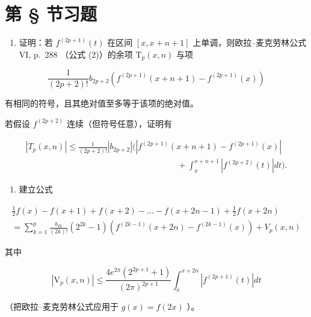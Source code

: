 \section*{第 \S{} 节习题}
{}

\begin{enumerate}
\def\labelenumi{\arabic{enumi})}
\tightlist
\item
  证明：若 \(f^{(2p + 1)}(t)\) 在区间 \([x, x + n + 1]\) 上单调，则欧拉–麦克劳林公式 VI, p.~288 （公式 (2)）的余项 \(\mathrm{T}_p(x, n)\) 与项
\end{enumerate}

\[
\frac {1}{(2 p + 2) !} b _ {2 p + 2} \left(f ^ {(2 p + 1)} (x + n + 1) - f ^ {(2 p + 1)} (x)\right)
\]

有相同的符号，且其绝对值至多等于该项的绝对值。

若假设 \(f^{(2p+2)}\) 连续（但符号任意），证明有

\[
\begin{array}{c} \left| T _ {p} (x, n) \right| \leqslant \frac {1}{(2 p + 2) !} \left| b _ {2 p + 2} \right| \Bigg (\left| f ^ {(2 p + 1)} (x + n + 1) - f ^ {(2 p + 1)} (x) \right| \\ \qquad \qquad \qquad \qquad \qquad \qquad \qquad \qquad \qquad + \int_ {x} ^ {x + n + 1} \left| f ^ {(2 p + 2)} (t) \right| d t \Bigg). \end{array}
\]

\begin{enumerate}
\def\labelenumi{\arabic{enumi})}
\setcounter{enumi}{1}
\tightlist
\item
  建立公式
\end{enumerate}

\[
\begin{array}{l} \frac {1}{2} f (x) - f (x + 1) + f (x + 2) - \dots - f (x + 2 n - 1) + \frac {1}{2} f (x + 2 n) \\ = \sum_ {k = 1} ^ {p} \frac {b _ {2 k}}{(2 k) !} (2 ^ {2 k} - 1) (f ^ {(2 k - 1)} (x + 2 n) - f ^ {(2 k - 1)} (x)) + V _ {p} (x, n) \end{array}
\]

其中

\[
\left| \mathrm{V} _ {p} (x, n) \right| \leqslant \frac {4 e ^ {2 \pi} \left(2 ^ {2 p + 1} + 1\right)}{(2 \pi) ^ {2 p + 1}} \int_ {x} ^ {x + 2 n} \left| f ^ {(2 p + 1)} (t) \right| d t
\]

（把欧拉–麦克劳林公式应用于 \(g(x) = f(2x)\) ）。

